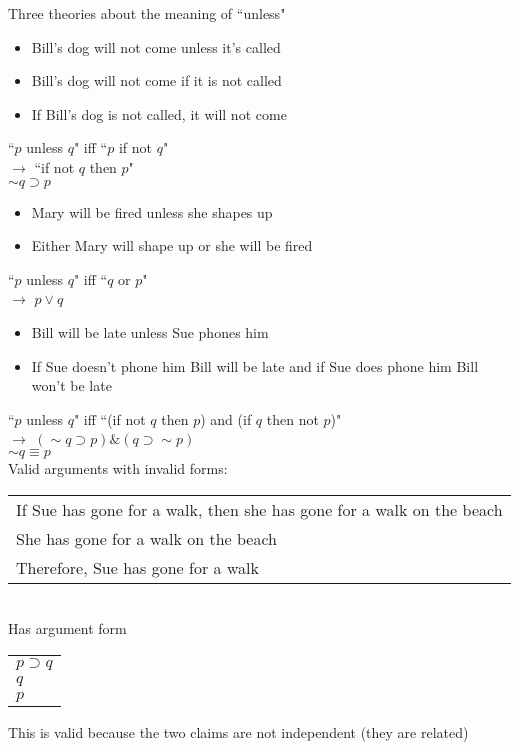 Three theories about the meaning of ``unless"
\begin{itemize}
    \item Bill's dog will not come unless it's called
    \item Bill's dog will not come if it is not called
    \item If Bill's dog is not called, it will not come
\end{itemize}
``$p$ unless $q$" iff ``$p$ if not $q$"\\
$\to$ ``if not $q$ then $p$"\\
$\sim q \supset p$\\

\begin{itemize}
    \item Mary will be fired unless she shapes up
    \item Either Mary will shape up or she will be fired
\end{itemize}
``$p$ unless $q$" iff ``$q$ or $p$"\\
$\to$ $p\vee q$\\

\begin{itemize}
    \item Bill will be late unless Sue phones him
    \item If Sue doesn't phone him Bill will be late and if Sue does phone him Bill won't be late
\end{itemize}
``$p$ unless $q$" iff ``(if not $q$ then $p$) and (if $q$ then not $p$)"\\
$\to$ $(\sim q\supset p)\&(q\supset\sim p)$\\
$\sim q\equiv p$\\

Valid arguments with invalid forms:\\
\begin{tabular}{p{12cm}}
    If Sue has gone for a walk, then she has gone for a walk on the beach\\
    She has gone for a walk on the beach\\
    \hline
    Therefore, Sue has gone for a walk
\end{tabular}\\
Has argument form\\
\begin{tabular}{p{2cm}}
    $p\supset q$\\
    $q$\\
    \hline
    $p$
\end{tabular}
This is valid because the two claims are not independent (they are related)\\


